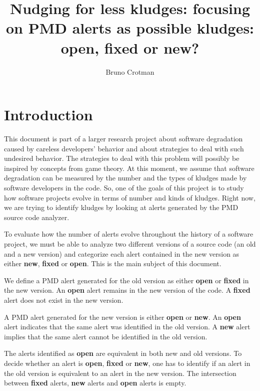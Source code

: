 \documentclass[
]{article}
\title{Nudging for less kludges: focusing on PMD alerts as possible kludges:
open, fixed or new?}
\author{Bruno Crotman}
\date{}
\begin{document}
\maketitle

{
\setcounter{tocdepth}{3}
\tableofcontents
}
\small

\normalsize

\section{Introduction}\label{intro}

This document is part of a larger research project about software
degradation caused by careless developers' behavior and about strategies
to deal with such undesired behavior. The strategies to deal with this
problem will possibly be inspired by concepts from game theory. At this
moment, we assume that software degradation can be measured by the
number and the types of kludges made by software developers in the code.
So, one of the goals of this project is to study how software projects
evolve in terms of number and kinds of kludges. Right now, we are trying
to identify kludges by looking at alerts generated by the PMD source
code analyzer.

To evaluate how the number of alerts evolve throughout the history of a
software project, we must be able to analyze two different versions of a
source code (an old and a new version) and categorize each alert
contained in the new version as either \textbf{new}, \textbf{fixed} or
\textbf{open}. This is the main subject of this document.

We define a PMD alert generated for the old version as either
\textbf{open} or \textbf{fixed} in the new version. An \textbf{open}
alert remains in the new version of the code. A \textbf{fixed} alert
does not exist in the new version.

A PMD alert generated for the new version is either \textbf{open} or
\textbf{new}. An \textbf{open} alert indicates that the same alert was
identified in the old version. A \textbf{new} alert implies that the
same alert cannot be identified in the old version.

The alerts identified as \textbf{open} are equivalent in both new and
old versions. To decide whether an alert is \textbf{open},
\textbf{fixed} or \textbf{new}, one has to identify if an alert in the
old version is equivalent to an alert in the new version. The
intersection between \textbf{fixed} alerts, \textbf{new} alerts and
\textbf{open} alerts is empty.
\end{document}
